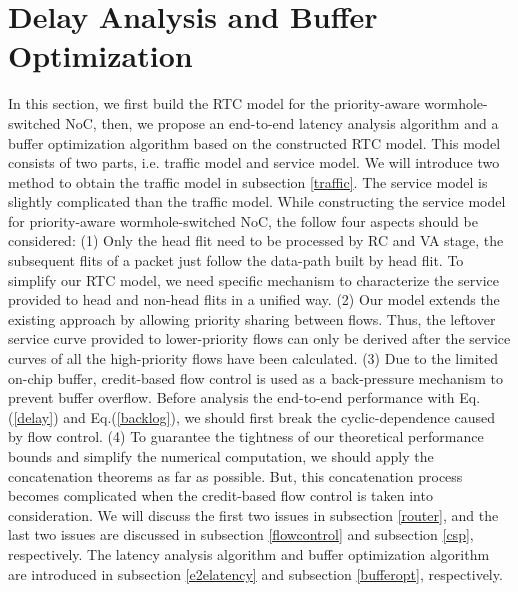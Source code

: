 \documentclass[10pt,journal]{IEEEtran}
\begin{document}
\section{Delay Analysis and Buffer Optimization}\label{modeling}
In this section, we first build the RTC model for the priority-aware wormhole-switched NoC, then, we propose an end-to-end latency analysis algorithm and a buffer optimization algorithm based on the constructed RTC model. This model consists of two parts, i.e. traffic model and service model. We will introduce two method to obtain the traffic model in subsection \ref{traffic}. The service model is slightly complicated than the traffic model. While constructing the service model for priority-aware wormhole-switched NoC, the follow four aspects should be considered: (1) Only the head flit need to be processed by RC and VA stage, the subsequent flits of a packet just follow the data-path built by head flit. To simplify our RTC model, we need specific mechanism to characterize the service provided to head and non-head flits in a unified way. (2) Our model extends the existing approach \cite{73}\cite{Qian489900} by allowing priority sharing between flows. Thus, the leftover service curve provided to lower-priority flows can only be derived after the service curves of all the high-priority flows have been calculated. (3) Due to the limited on-chip buffer, credit-based flow control is used as a back-pressure mechanism to prevent buffer overflow. Before analysis the end-to-end performance with Eq.(\ref{delay}) and Eq.(\ref{backlog}), we should first break the cyclic-dependence caused by flow control. (4) To guarantee the tightness of our theoretical performance bounds and simplify the numerical computation, we should apply the concatenation theorems as far as possible. But, this concatenation process becomes complicated when the credit-based flow control is taken into consideration. We will discuss the first two issues in subsection \ref{router}, and the last two issues are discussed in subsection \ref{flowcontrol} and subsection \ref{csp}, respectively. The latency analysis algorithm and buffer optimization algorithm are introduced in subsection \ref{e2elatency} and subsection \ref{bufferopt}, respectively.
\end{document}
